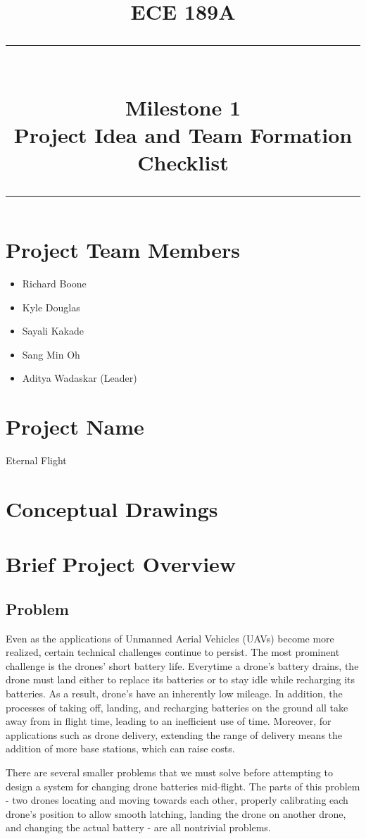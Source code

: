 \documentclass[paper=a4, fontsize=12pt]{scrartcl}
\title{
		\vspace{-0.5in} 	
		\usefont{OT1}{bch}{b}{n}
		\normalfont \normalsize \textsc{ECE 189A} \\ [10pt]
		\rule{\linewidth}{2pt} \\ [0.4cm]
		\huge Milestone 1 \\
		\Large Project Idea and Team Formation Checklist
		\rule{\linewidth}{2pt}
}
\author{
}
\date{}
\begin{document}
\maketitle


\vspace{-1in}
\section{Project Team Members}
\begin{itemize}
	\item Richard Boone
	\item Kyle Douglas
	\item Sayali Kakade
	\item Sang Min Oh
	\item Aditya Wadaskar (Leader)
\end{itemize}

\section{Project Name}
Eternal Flight

\section{Conceptual Drawings}

\section{Brief Project Overview}
\subsection{Problem}
Even as the applications of Unmanned Aerial Vehicles (UAVs) become more realized, certain technical challenges continue to persist. 
The most prominent challenge is the drones' short battery life. 
Everytime a drone's battery drains, the drone must land either to replace its batteries or to stay idle while recharging its batteries. 
As a result, drone's have an inherently low mileage. 
In addition, the processes of taking off, landing, and recharging batteries on the ground all take away from in flight time, leading to an inefficient use of time.
Moreover, for applications such as drone delivery, extending the range of delivery means the addition of more base stations, which can raise costs.

There are several smaller problems that we must solve before attempting to design a system for changing drone batteries mid-flight.
The parts of this problem - two drones locating and moving towards each other, properly calibrating each drone's position to allow smooth latching, landing the drone on another drone, and changing the actual battery - are all nontrivial problems. 
\end{document}
